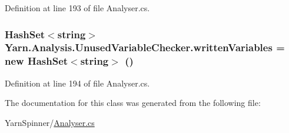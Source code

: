 Definition at line 193 of file Analyser.\-cs.

\hypertarget{a00165_a0c2fe6eded1b10b135ca2469f5980a39}{
\subsubsection[{written\-Variables}]{\setlength{\rightskip}{0pt plus 5cm}Hash\-Set$<$string$>$ Yarn.\-Analysis.\-Unused\-Variable\-Checker.\-written\-Variables = new Hash\-Set$<$string$>$ ()\hspace{0.3cm}{\ttfamily [private]}}}\label{a00165_a0c2fe6eded1b10b135ca2469f5980a39}


Definition at line 194 of file Analyser.\-cs.



The documentation for this class was generated from the following file\-:\begin{DoxyCompactItemize}
\item 
Yarn\-Spinner/\hyperlink{a00282}{Analyser.\-cs}\end{DoxyCompactItemize}
